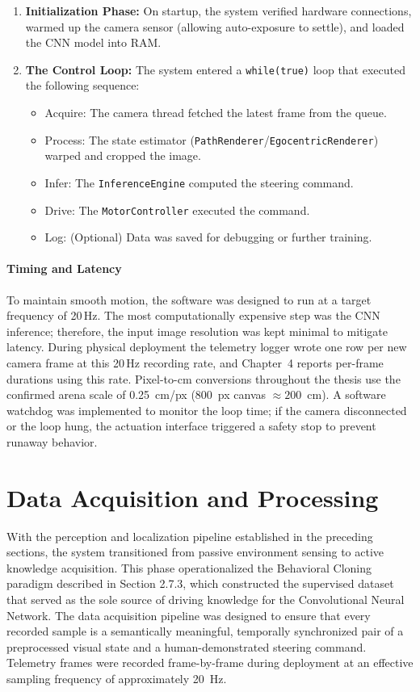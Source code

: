 \begin{enumerate}
    \item \textbf{Initialization Phase:} On startup, the system verified hardware connections, warmed up the camera sensor (allowing auto-exposure to settle), and loaded the CNN model into RAM.
    \item \textbf{The Control Loop:} The system entered a \texttt{while(true)} loop that executed the following sequence:
    \begin{itemize}
        \item Acquire: The camera thread fetched the latest frame from the queue.
        \item Process: The state estimator (\texttt{PathRenderer}/\texttt{EgocentricRenderer}) warped and cropped the image.
        \item Infer: The \texttt{InferenceEngine} computed the steering command.
        \item Drive: The \texttt{MotorController} executed the command.
        \item Log: (Optional) Data was saved for debugging or further training.
    \end{itemize}
\end{enumerate}

\paragraph{Timing and Latency}
To maintain smooth motion, the software was designed to run at a target frequency of 20\,Hz. The most computationally expensive step was the CNN inference; therefore, the input image resolution was kept minimal to mitigate latency. During physical deployment the telemetry logger wrote one row per new camera frame at this 20\,Hz recording rate, and Chapter~4 reports per-frame durations using this rate. Pixel-to-cm conversions throughout the thesis use the confirmed arena scale of 0.25~cm/px ($800$~px canvas $\approx 200$~cm). A software watchdog was implemented to monitor the loop time; if the camera disconnected or the loop hung, the actuation interface triggered a safety stop to prevent runaway behavior.


\section{Data Acquisition and Processing}

With the perception and localization pipeline established in the preceding sections, the system
transitioned from passive environment sensing to active knowledge acquisition. This phase
operationalized the Behavioral Cloning paradigm described in Section 2.7.3, which constructed the
supervised dataset that served as the sole source of driving knowledge for the Convolutional
Neural Network. The data acquisition pipeline was designed to ensure that every recorded sample
is a semantically meaningful, temporally synchronized pair of a preprocessed visual state and a
human-demonstrated steering command. Telemetry frames were recorded frame-by-frame during deployment at an effective sampling frequency of approximately 20~Hz.

